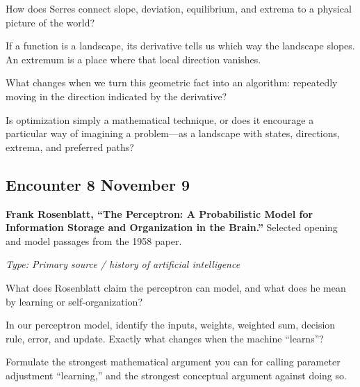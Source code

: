 \begin{description}[leftmargin=1.15in,style=nextline]

\item[\textcolor{LangRed}{READ}]
How does Serres connect slope, deviation, equilibrium, and extrema
to a physical picture of the world?

\item[\textcolor{LangRed}{CONNECT}]
If a function is a landscape, its derivative tells us which way
the landscape slopes. An extremum is a place where that local
direction vanishes.

What changes when we turn this geometric fact into an algorithm:
repeatedly moving in the direction indicated by the derivative?

\item[\textcolor{LangRed}{QUESTION}]
Is optimization simply a mathematical technique, or does it encourage
a particular way of imagining a problem---as a landscape with states,
directions, extrema, and preferred paths?

\end{description}


\subsection*{Encounter 8 \hfill November 9}

\textbf{Frank Rosenblatt, ``The Perceptron: A Probabilistic Model for
Information Storage and Organization in the Brain.''}
Selected opening and model passages from the 1958 paper.

\textit{Type: Primary source / history of artificial intelligence}

\begin{description}[leftmargin=1.15in,style=nextline]
\item[\textcolor{LangRed}{READ}]
What does Rosenblatt claim the perceptron can model, and what does he mean by
learning or self-organization?
\item[\textcolor{LangRed}{CONNECT}]
In our perceptron model, identify the inputs, weights, weighted sum, decision
rule, error, and update. Exactly what changes when the machine ``learns''?
\item[\textcolor{LangRed}{QUESTION}]
Formulate the strongest mathematical argument you can for calling parameter
adjustment ``learning,'' and the strongest conceptual argument against doing so.
\end{description}

